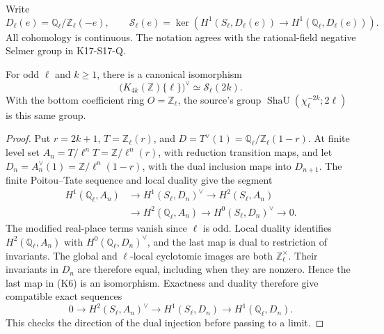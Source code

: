 Write
\[
 D_\ell(e)=\mathbb Q_\ell/\mathbb Z_\ell(-e),\qquad
 \mathcal S_\ell(e)=
 \ker\!\left(H^1(S_\ell,D_\ell(e))
              \longrightarrow H^1(\mathbb Q_\ell,D_\ell(e))\right).
\]
All cohomology is continuous. The notation agrees with the
rational-field negative Selmer group in K17-S17-Q.

\begin{theorem}
For odd \(\ell\) and \(k\ge1\), there is a canonical isomorphism
\[
 \bigl(K_{4k}(\mathbb Z)\{\ell\}\bigr)^\vee
       \simeq\mathcal S_\ell(2k).                     \tag{K5}
\]
With the bottom coefficient ring \(O=\mathbb Z_\ell\), the
source's group
\(\operatorname{ShaU}(\chi_\ell^{-2k};2\ell)\)
is this same group.
\end{theorem}

\begin{proof}
Put \(r=2k+1\), \(T=\mathbb Z_\ell(r)\), and
\(D=T^\vee(1)=\mathbb Q_\ell/\mathbb Z_\ell(1-r)\).
At finite level set
\(A_n=T/\ell^nT=\mathbb Z/\ell^n(r)\), with reduction
transition maps, and let
\(D_n=A_n^\vee(1)=\mathbb Z/\ell^n(1-r)\), with the
dual inclusion maps into \(D_{n+1}\).
The finite Poitou--Tate sequence and local duality
\cite[I, Theorem~4.10; II, Theorem~2.9]{MilneADT}
give the segment
\[
\begin{split}
 H^1(\mathbb Q_\ell,A_n)&\longrightarrow H^1(S_\ell,D_n)^\vee
 \longrightarrow H^2(S_\ell,A_n)\\
 &\longrightarrow H^2(\mathbb Q_\ell,A_n)
 \longrightarrow H^0(S_\ell,D_n)^\vee\longrightarrow0.
\end{split}
\tag{K6}
\]
The modified real-place terms vanish since \(\ell\) is odd.
Local duality identifies \(H^2(\mathbb Q_\ell,A_n)\) with
\(H^0(\mathbb Q_\ell,D_n)^\vee\), and the last map is dual to
restriction of invariants. The global and \(\ell\)-local
cyclotomic images are both \(\mathbb Z_\ell^\times\). Their
invariants in \(D_n\) are therefore equal, including when they are
nonzero. Hence the last map in (K6) is an isomorphism.
Exactness and duality therefore give compatible exact sequences
\[
 0\longrightarrow H^2(S_\ell,A_n)^\vee
 \longrightarrow H^1(S_\ell,D_n)
 \longrightarrow H^1(\mathbb Q_\ell,D_n).
\]
This checks the direction of the dual injection before passing
to a limit.


\end{proof}
